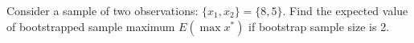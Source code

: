 
\begin{question}
Consider a sample of two observations: \(\{x_1,x_2\} = \{8, 5\}\). Find the expected value of bootstrapped sample maximum \(E(\max{x^*})\) if bootstrap sample size is 2.
\end{question}


